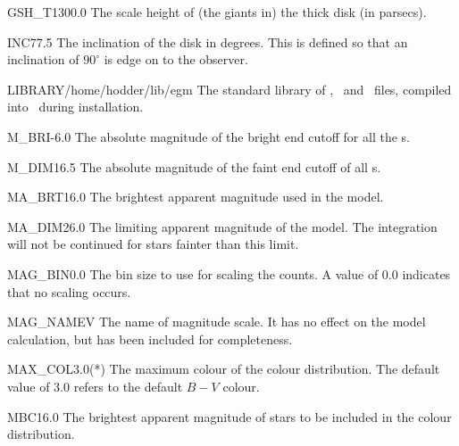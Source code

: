 \begin{key}{GSH\_T}{1300.0}{}
The scale height of (the giants in) the thick disk (in parsecs).
\end{key}

\begin{key}{INC}{77.5}{}
The inclination of the disk in degrees. This is defined so that an 
inclination of $90^{\circ}$ is edge on to the observer.
\end{key}

\begin{key}{LIBRARY}{/home/hodder/lib/egm}{}
The standard library of \lf, \cmd\ and \fms\ files, compiled into \egm\ during 
installation.
\end{key}

\begin{key}{M\_BRI}{-6.0}{}
The absolute magnitude of the bright end cutoff for all the \lf s.
\end{key}

\begin{key}{M\_DIM}{16.5}{}
The absolute magnitude of the faint end cutoff of all \lf s.
\end{key}

\begin{key}{MA\_BRT}{16.0}{}
The brightest apparent magnitude used in the model.
\end{key}

\begin{key}{MA\_DIM}{26.0}{}
The limiting apparent magnitude of the model. The integration will not be 
continued for stars fainter than this limit.
\end{key}

\begin{key}{MAG\_BIN}{0.0}{}
The bin size to use for scaling the counts. A value of 
0.0 indicates that no scaling occurs.
\end{key}

\begin{key}{MAG\_NAME}{V}{}
The name of magnitude scale. It has no effect on the model calculation, but 
has been included for completeness.
\end{key}

\begin{key}{MAX\_COL}{3.0}{(*)}
The maximum colour of the colour distribution. The default value of 3.0 
refers to the default $B-V$ colour.
\end{key}

\begin{key}{MBC}{16.0}{}
The brightest apparent magnitude of stars to be included in the colour 
distribution.
\end{key}

